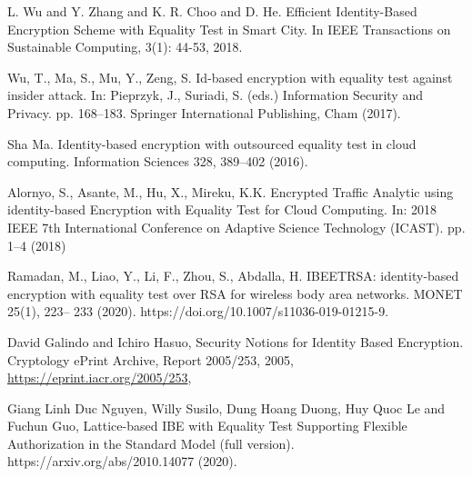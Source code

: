 \documentclass[runningheads,10pt]{llncs}
\begin{document}
\begin{thebibliography}{99}
	L. {Wu} and Y. {Zhang} and K. R. {Choo} and D. {He}.
	\newblock Efficient Identity-Based Encryption Scheme with Equality Test in Smart City.
	\newblock In IEEE Transactions on Sustainable Computing, 3(1): 44-53, 2018.
	
		Wu, T., Ma, S., Mu, Y., Zeng, S.
	\newblock Id-based encryption with
	equality test against insider attack. \newblock In: Pieprzyk, J., Suriadi,
	S. (eds.) Information Security and Privacy. pp. 168–183.
	Springer International Publishing, Cham (2017).
	
	
	 Sha Ma.
	\newblock
	Identity-based encryption with outsourced equality
	test in cloud computing. 	\newblock Information Sciences 328, 389–402
	(2016).
	
	
	
		 Alornyo, S., Asante, M., Hu, X., Mireku, K.K. 	\newblock Encrypted
	Traffic Analytic using identity-based Encryption with Equality Test for Cloud Computing. 	\newblock In: 2018 IEEE 7th International
	Conference on Adaptive Science Technology (ICAST). pp. 1–4 (2018)
	
	
	
		Ramadan, M., Liao, Y., Li, F., Zhou, S., Abdalla, H. \newblock IBEETRSA: identity-based encryption with equality test over RSA
	for wireless body area networks. \newblock MONET 25(1), 223–
	233 (2020). https://doi.org/10.1007/s11036-019-01215-9.
	
	 {David Galindo and Ichiro Hasuo}, \newblock Security Notions for Identity Based Encryption. \newblock Cryptology ePrint Archive, Report 2005/253, 2005, \url{https://eprint.iacr.org/2005/253}, 
	
	 {Giang Linh Duc Nguyen, Willy Susilo, Dung Hoang Duong, Huy Quoc Le and Fuchun Guo}, \newblock Lattice-based IBE with Equality Test Supporting
Flexible Authorization in the Standard Model (full version). \newblock https://arxiv.org/abs/2010.14077 (2020). 
	

	
	
	
	
\end{thebibliography}
\end{document}
